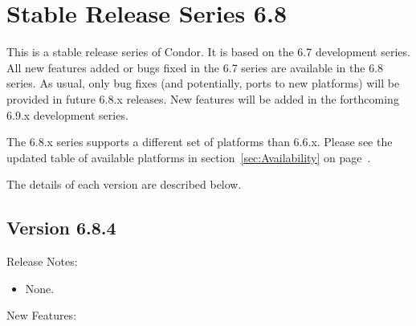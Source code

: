 
\section{\label{sec:History-6-8}Stable Release Series 6.8}

This is a stable release series of Condor.
It is based on the 6.7 development series.
All new features added or bugs fixed in the 6.7 series are available
in the 6.8 series.
As usual, only bug fixes (and potentially, ports to new platforms)
will be provided in future 6.8.x releases.
New features will be added in the forthcoming 6.9.x development series.


The 6.8.x series supports a different set of platforms than 6.6.x.
Please see the updated table of available platforms in
section~\ref{sec:Availability} on page~\pageref{sec:Availability}.

The details of each version are described below.

\subsection*{\label{sec:New-6-8-4}Version 6.8.4}

\noindent Release Notes:

\begin{itemize}

\item None.

\end{itemize}


\noindent New Features:


